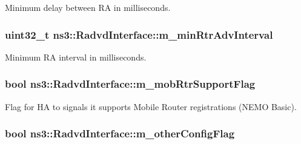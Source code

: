 Minimum delay between RA in milliseconds. 

\subsubsection[{\texorpdfstring{m\+\_\+min\+Rtr\+Adv\+Interval}{m_minRtrAdvInterval}}]{\setlength{\rightskip}{0pt plus 5cm}uint32\+\_\+t ns3\+::\+Radvd\+Interface\+::m\+\_\+min\+Rtr\+Adv\+Interval\hspace{0.3cm}{\ttfamily [private]}}\hypertarget{classns3_1_1RadvdInterface_ad98b9173e0f124d93265d6e141feaac1}{}\label{classns3_1_1RadvdInterface_ad98b9173e0f124d93265d6e141feaac1}


Minimum RA interval in milliseconds. 

\subsubsection[{\texorpdfstring{m\+\_\+mob\+Rtr\+Support\+Flag}{m_mobRtrSupportFlag}}]{\setlength{\rightskip}{0pt plus 5cm}bool ns3\+::\+Radvd\+Interface\+::m\+\_\+mob\+Rtr\+Support\+Flag\hspace{0.3cm}{\ttfamily [private]}}\hypertarget{classns3_1_1RadvdInterface_ad3bbc067bb5b7f5618014bb498c6e0ea}{}\label{classns3_1_1RadvdInterface_ad3bbc067bb5b7f5618014bb498c6e0ea}


Flag for HA to signals it supports Mobile Router registrations (N\+E\+MO Basic). 

\subsubsection[{\texorpdfstring{m\+\_\+other\+Config\+Flag}{m_otherConfigFlag}}]{\setlength{\rightskip}{0pt plus 5cm}bool ns3\+::\+Radvd\+Interface\+::m\+\_\+other\+Config\+Flag\hspace{0.3cm}{\ttfamily [private]}}\hypertarget{classns3_1_1RadvdInterface_a79d80eab87a65685723abd069bfb1a2e}{}\label{classns3_1_1RadvdInterface_a79d80eab87a65685723abd069bfb1a2e}


